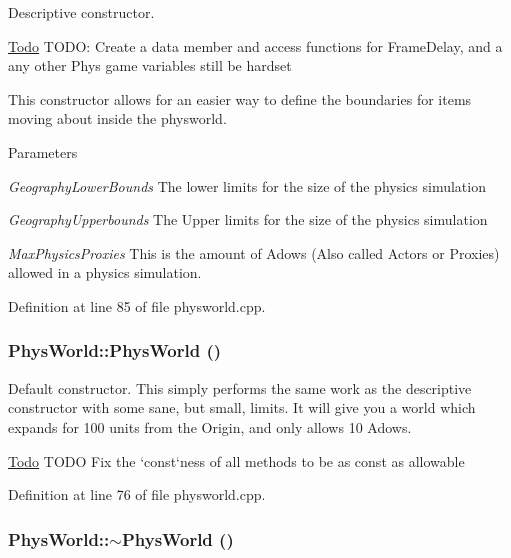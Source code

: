 Descriptive constructor. \begin{Desc}
\item[\hyperlink{todo__todo000012}{Todo}]TODO: Create a data member and access functions for FrameDelay, and a any other Phys game variables still be hardset \end{Desc}


This constructor allows for an easier way to define the boundaries for items moving about inside the physworld. 
\begin{DoxyParams}{Parameters}
\item[{\em GeographyLowerBounds}]The lower limits for the size of the physics simulation \item[{\em GeographyUpperbounds}]The Upper limits for the size of the physics simulation \item[{\em MaxPhysicsProxies}]This is the amount of Adows (Also called Actors or Proxies) allowed in a physics simulation. \end{DoxyParams}


Definition at line 85 of file physworld.cpp.\hypertarget{classPhysWorld_a6ded8026b0cd72e7877830698197adf0}{
\subsubsection[{PhysWorld}]{\setlength{\rightskip}{0pt plus 5cm}PhysWorld::PhysWorld ()}}
\label{db/df5/classPhysWorld_a6ded8026b0cd72e7877830698197adf0}


Default constructor. This simply performs the same work as the descriptive constructor with some sane, but small, limits. It will give you a world which expands for 100 units from the Origin, and only allows 10 Adows.

\begin{Desc}
\item[\hyperlink{todo__todo000006}{Todo}]TODO Fix the `const`ness of all methods to be as const as allowable \end{Desc}


Definition at line 76 of file physworld.cpp.\hypertarget{classPhysWorld_acdfe3b4c1c236860dc7dff945cfe5b07}{
\subsubsection[{$\sim$PhysWorld}]{\setlength{\rightskip}{0pt plus 5cm}PhysWorld::$\sim$PhysWorld ()}}
\label{db/df5/classPhysWorld_acdfe3b4c1c236860dc7dff945cfe5b07}


